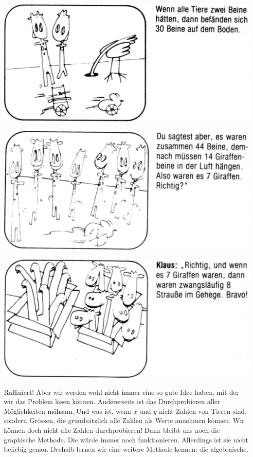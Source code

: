 \documentclass[%
11pt,%
twoside,%
titlepage,%
german,%
]{scrartcl}
\begin{document}
	\begin{center}
	\includegraphics[width=0.9\columnwidth,bb=14 14 956 467]{pictures/augenbeine5t.eps}

	\medskip
	\includegraphics[width=0.9\columnwidth,bb=14 14 946 470]{pictures/augenbeine6t.eps}

	\medskip
	\includegraphics[width=\columnwidth,bb=14 14 950 470]{pictures/augenbeine7t.eps}
	\end{center}


Raffiniert! Aber wir werden wohl nicht immer eine so gute Idee haben, mit der wir das Problem l\"osen k\"onnen. Andererseits ist das Durchprobieren aller M\"oglichkeiten m\"uhsam. Und was ist, wenn $x$ und $y$ nicht Zahlen von Tieren sind, sondern Gr\"ossen, die grunds\"atzlich alle Zahlen als Werte annehmen k\"onnen. Wir k\"onnen doch nicht alle Zahlen durchprobieren! Dann bleibt uns noch die graphische Methode. Die w\"urde immer noch funktionieren. Allerdings ist sie nicht beliebig genau. Deshalb lernen wir eine weitere Methode kennen: die algebraische.
\end{document}
